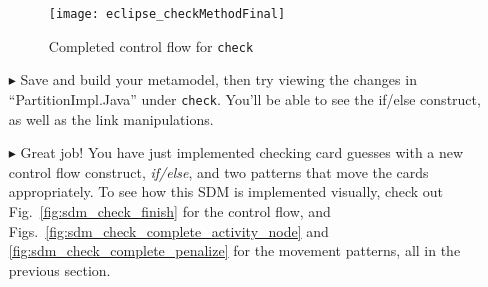 \begin{itemize}
\vspace{0.5cm}

\begin{figure}[htbp]
\begin{center}
  \texttt{[image: eclipse\_checkMethodFinal]}
  \caption{Completed control flow for \texttt{check}}
  \label{fig:finalMethod}
\end{center}
\end{figure}

\item[$\blacktriangleright$] Save and build your metamodel, then try viewing the changes in ``PartitionImpl.Java'' under \texttt{check}. You'll be able to
see the if/else construct, as well as the link manipulations. 

\item[$\blacktriangleright$] Great job! You have just implemented checking card guesses with a new control flow construct, \emph{if/else}, and two patterns that
move the cards appropriately. To see how this SDM is implemented visually, check out Fig.~\ref{fig:sdm_check_finish} for the control flow, and
Figs.~\ref{fig:sdm_check_complete_activity_node} and \ref{fig:sdm_check_complete_penalize} for the movement patterns, all in the previous section.

\end{itemize}
 
